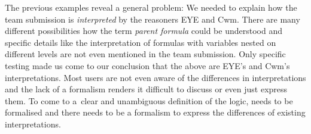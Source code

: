 The previous examples reveal a general problem: 
We needed to explain how the \wwwc team submission is \emph{interpreted} by the reasoners EYE and Cwm.  %
There are many different possibilities how the term \emph{parent formula} could be understood 
and specific details like the interpretation of formulas with variables nested on different levels are not even mentioned in the \wwwc team submission. 
Only
specific testing made us come to our conclusion that the above are EYE's and Cwm's interpretations. %
Most users are not even aware of the differences in interpretations and the lack of a formalism renders it difficult to discuss or even just express them. %
To come to a~clear and unambiguous definition of the logic, 
\nthree needs to be formalised and there needs to be a formalism to express the differences of existing interpretations. 
% 
% 
% 
% 
% 
% 
